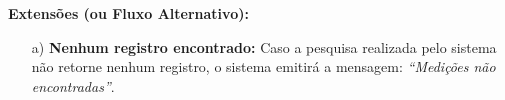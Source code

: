 \begin{quadro}[H]
\begin{framed}
\begin{flushleft}
		\textbf{Extensões (ou Fluxo Alternativo):}
		\begin{itemize}
			\item[a)] \textbf{Nenhum registro encontrado:} Caso a pesquisa  realizada pelo sistema não retorne nenhum registro, o sistema emitirá a mensagem: \textit{``Medições não encontradas''}.
		\end{itemize}


		\end{flushleft}

	\end{framed}

\end {quadro} %

